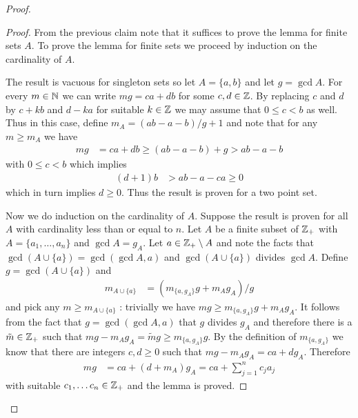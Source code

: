 \begin{proof}
\begin{proof}
From the previous claim note that it suffices to prove the lemma for
finite sets $A$.  To prove the lemma for finite sets we proceed by
induction on the cardinality of $A$.

The result is vacuous for singleton sets so let $A = \lbrace a, b \rbrace$ and let $g = \gcd A$.  For
every $m \in \mathbb{N}$ we can write $m g = ca + db$ for some $c,d \in
\mathbb{Z}$.  By replacing $c$ and $d$ by $c + kb$ and $d - ka$ for
suitable $k \in \mathbb{Z}$ we may assume that $0 \leq c < b$ as well.
Thus in this case, define $m_A = (ab - a -b)/g +1$ and note that for
any $m \geq m_A$ we have
\begin{align*}
m g &=ca + db  \geq (ab - a - b) + g >  ab - a - b
\end{align*}
with $0 \leq c < b$ which implies
\begin{align*}
(d+1)b  &> ab - a - ca \geq 0
\end{align*}
which in turn implies $d \geq 0$.  Thus the result is proven for a two
point set.

Now we do induction on the cardinality of $A$.  Suppose the result is
proven for all $A$ with cardinality less than or equal to $n$.  Let $A$ be a finite
subset of $\mathbb{Z}_+$ with $A = \lbrace a_1, \dotsc, a_n \rbrace$ and $\gcd A = g_A$.  Let $a \in \mathbb{Z}_+
\setminus A$ and note the facts that $\gcd (A \cup \lbrace a \rbrace ) =
\gcd(\gcd A, a)$ and $\gcd(A \cup \lbrace a \rbrace )$ divides $\gcd
A$.  Define $g =  \gcd( A \cup \lbrace a \rbrace)$ and 
\begin{align*}
m_{A \cup  \lbrace a \rbrace} &= (m_{\lbrace a,  g_A \rbrace} g + m_A g_A)/g
\end{align*}
and pick any $m \geq m_{A \cup \lbrace a \rbrace}$ :  trivially we have
$m g \geq m_{\lbrace a,  g_A \rbrace} g + m_A g_A$.  It follows from the
fact that $g = \gcd(\gcd A, a)$ that $g$ divides $g_A$ and therefore
there is a $\tilde{m} \in \mathbb{Z}_+$ such that $mg - m_A g_A = \tilde{m} g \geq m_{\lbrace a,  g_A
  \rbrace} g$.
By the definition of $m_{\lbrace a,  g_A \rbrace}$ we know that
there are integers $c,d \geq 0$ such that $mg - m_A g_A = c a + d
g_A$.  Therefore
\begin{align*}
mg &= ca + (d + m_A) g_A = ca + \sum_{j=1}^n c_j a_j
\end{align*}
with suitable $c_1, \dotsc c_n \in \mathbb{Z}_+$ and the lemma is
proved.
\end{proof}


\end{proof}
